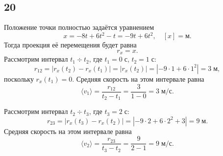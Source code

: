 \subsection{20}

Положение точки полностью задаётся уравнением
\[
x=-8t+6t^2-t=-9t+6t^2,\quad[x]=\text{м}.
\]
Тогда проекция её перемещения будет равна
\[
r_x=x.
\]
Рассмотрим интервал $t_1\div t_2$, где $t_1=0\;\text{с}$, $t_2=1\;\text{с}$:
\[
r_{12}=|r_x(t_2)-r_x(t_1)|=|r_x(t_2)|=\left|-9\cdot1+6\cdot1^2\right|=3\;\text{м},
\]
поскольку $r_x(t_1)=0$. Средняя скорость на этом интервале равна
\[
\langle v_1\rangle=\frac{r_{12}}{t_2-t_1}=\frac{3}{1-0}=3\;\text{м/с}.
\]

Рассмотрим интервал $t_2\div t_3$, где $t_3=2\;\text{с}$:
\[
r_{23}=|r_x(t_3)-r_x(t_2)|=\left|-9\cdot2+6\cdot2^2+3\right|=9\;\text{м}.
\]
Средняя скорость на этом интервале равна
\[
\langle v_2\rangle=\frac{r_{23}}{t_3-t_2}=\frac{9}{2-1}=9\;\text{м/с}.
\]